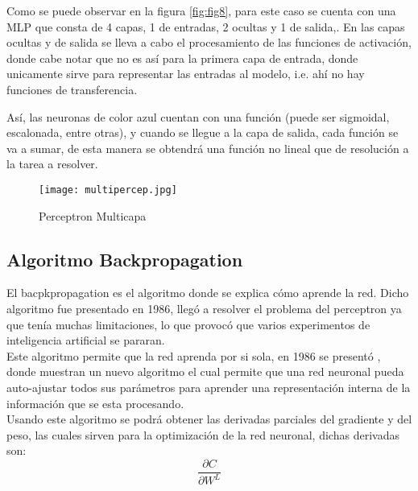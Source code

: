             Como se puede observar en la figura \eqref{fig:fig8}, para este caso se cuenta con una MLP que consta de 4 capas,  1 de entradas, 2 ocultas y 1 de salida,. En las capas ocultas y de salida se lleva a cabo el procesamiento de las funciones de activación, donde cabe notar que no es así para la primera capa de entrada, donde unicamente sirve para representar las entradas al modelo, i.e. ahí no hay funciones de transferencia. 
            
Así, las neuronas de color azul cuentan con una funci\'on (puede ser sigmoidal, escalonada, entre otras), 
            y cuando se llegue a la capa de salida, cada funci\'on se va a sumar, de esta manera 
            se obtendrá una funci\'on no lineal que de resoluci\'on a la tarea a resolver.

            \begin{figure}[H]
                \centering
                \texttt{[image: multipercep.jpg]}
                \caption{Perceptron Multicapa}
                \label{fig:fig8}
            \end{figure}

            
        \subsection{Algoritmo Backpropagation}
        	
        	
        	El bacpkpropagation es el algoritmo donde se explica c\'omo aprende la red.
            Dicho algoritmo fue presentado en 1986, lleg\'o a resolver el problema del perceptron 
            ya que ten\'ia muchas limitaciones, lo que provoc\'o que varios experimentos de inteligencia
            artificial se pararan.\\

            Este algoritmo permite que la red aprenda por si sola, en 1986 se present\'o \cite{rumelhart1986}, 
            donde muestran un nuevo algoritmo el cual permite que una red neuronal pueda auto-ajustar todos sus 
            parámetros para aprender una representaci\'on interna de la informaci\'on que se esta procesando.\\

            Usando este algoritmo se podrá obtener las derivadas parciales del gradiente y del peso, las cuales
            sirven para la optimizaci\'on de la red neuronal, dichas derivadas son:
            \begin{equation*}
                \frac{\partial C}{\partial W^L}
            \end{equation*}
            
